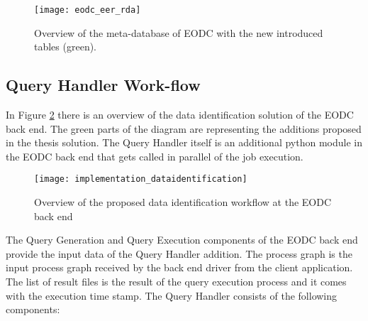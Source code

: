 \documentclass[draft,final]{vutinfth} %
\begin{document}
\begin{figure}[h]
	\centering
	\texttt{[image: eodc\_eer\_rda]}
	\caption{Overview of the meta-database of EODC with the new introduced tables (green).}
	\label{fig:eer_rda} %
\end{figure}

\subsection{Query Handler Work-flow}
In Figure \ref{fig:impldataid} there is an overview of the data identification solution of the EODC back end. The green parts of the diagram are representing the additions proposed in the thesis solution. The Query Handler itself is an additional python module in the EODC back end that gets called in parallel of the job execution. 

\begin{figure}[h]
	\centering
	\texttt{[image: implementation\_dataidentification]}
	\caption{Overview of the proposed data identification workflow at the EODC back end}
	\label{fig:impldataid} %
\end{figure}

The Query Generation and Query Execution components of the EODC back end provide the input data of the Query Handler addition. The process graph is the input process graph received by the back end driver from the client application. The list of result files is the result of the query execution process and it comes with the execution time stamp. The Query Handler consists of the following components:
\end{document}
